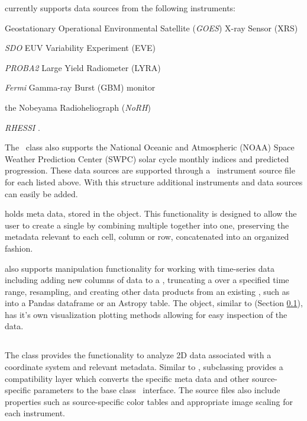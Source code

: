 \Timeseries currently supports data sources from the following instruments: 
\begin{inparaitem}
\item Geostationary Operational Environmental Satellite (\textit{GOES}) X-ray Sensor (XRS) 
\item \textit{SDO} EUV Variability Experiment (EVE) \citep{woods2010extreme}
\item \textit{PROBA2} Large Yield Radiometer (LYRA) \citep{dominique2013lyra}
\item \textit{Fermi} Gamma-ray Burst (GBM) monitor \citep{meegan2009fermi}
\item the Nobeyama Radioheliograph (\textit{NoRH}) \citep{nakajima1994nobeyama}
\item \textit{RHESSI} \citep{lin2003reuven}.
\end{inparaitem}
The \Timeseries\ class also supports the National Oceanic and Atmospheric (NOAA) Space Weather Prediction Center (SWPC) solar cycle monthly indices and predicted progression.
These data sources are supported through a \Timeseries\ instrument source file for each listed above.
With this structure additional instruments and data sources can easily be added.

\Timeseries holds meta data, stored in the \Timeseriesmetadata object.
This functionality is designed to allow the user to create a single \Timeseries by combining multiple \Timeseries together into one, preserving the metadata relevant to each cell, column or row, concatenated into an organized fashion.

\Timeseries also supports manipulation functionality for working with time-series data including adding new columns of data to a \Timeseries, truncating a \Timeseries over a specified time range, resampling, and creating other data products from an existing \Timeseries, such as into a Pandas dataframe or an Astropy table.
The \Timeseries object, similar to \Map (Section \ref{sec:map}), has it's own visualization plotting methods allowing for easy inspection of the data.

\subsection{\Map}
\label{sec:map}

The \Map class provides the functionality to analyze 2D data associated with a coordinate system and relevant metadata.
Similar to \Timeseries, subclassing provides a compatibility layer which converts the specific meta data and other source-specific parameters to the base class \GenericMap\ interface.
The source files also include properties such as source-specific color tables and appropriate image scaling for each instrument.

